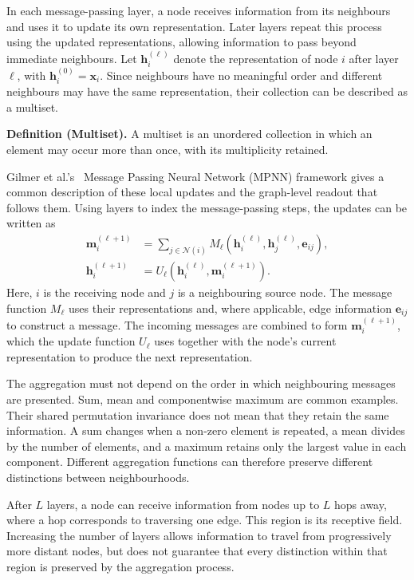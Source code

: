 \documentclass[11pt,a4paper]{article}
\begin{document}
In each message-passing layer, a node receives information from its neighbours and uses it to update its own representation. Later layers repeat this process using the updated representations, allowing information to pass beyond immediate neighbours. Let \(\mathbf{h}_i^{(\ell)}\) denote the representation of node \(i\) after layer \(\ell\), with \(\mathbf{h}_i^{(0)}=\mathbf{x}_i\). Since neighbours have no meaningful order and different neighbours may have the same representation, their collection can be described as a multiset.

\medskip
\noindent\textbf{Definition (Multiset).} A multiset is an unordered collection in which an element may occur more than once, with its multiplicity retained.

Gilmer et al.'s~\cite{gilmer2017neural} Message Passing Neural Network (MPNN) framework gives a common description of these local updates and the graph-level readout that follows them. Using layers to index the message-passing steps, the updates can be written as
\begin{equation}
\begin{aligned}
\mathbf{m}_i^{(\ell+1)}
&=\sum_{j\in\mathcal{N}(i)}
M_\ell\!\left(
\mathbf{h}_i^{(\ell)},
\mathbf{h}_j^{(\ell)},
\mathbf{e}_{ij}
\right),\\
\mathbf{h}_i^{(\ell+1)}
&=U_\ell\!\left(
\mathbf{h}_i^{(\ell)},
\mathbf{m}_i^{(\ell+1)}
\right).
\end{aligned}
\label{eq:mpnn-message}
\end{equation}
Here, \(i\) is the receiving node and \(j\) is a neighbouring source node. The message function \(M_\ell\) uses their representations and, where applicable, edge information \(\mathbf{e}_{ij}\) to construct a message. The incoming messages are combined to form \(\mathbf{m}_i^{(\ell+1)}\), which the update function \(U_\ell\) uses together with the node's current representation to produce the next representation.

The aggregation must not depend on the order in which neighbouring messages are presented. Sum, mean and componentwise maximum are common examples. Their shared permutation invariance does not mean that they retain the same information. A sum changes when a non-zero element is repeated, a mean divides by the number of elements, and a maximum retains only the largest value in each component. Different aggregation functions can therefore preserve different distinctions between neighbourhoods.

After \(L\) layers, a node can receive information from nodes up to \(L\) hops away, where a hop corresponds to traversing one edge. This region is its receptive field. Increasing the number of layers allows information to travel from progressively more distant nodes, but does not guarantee that every distinction within that region is preserved by the aggregation process.
\end{document}
